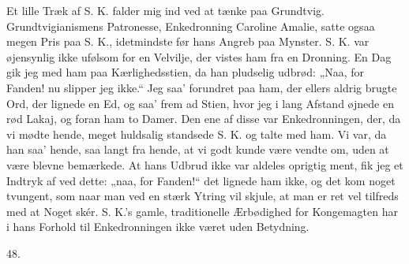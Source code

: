 \documentclass[12pt,a4paper,openany]{book}
\newcommand{\secnum}[1]{\par\begin{center}#1\end{center}\par\nobreak}
\newcommand{\opage}[1]{\marginnote{\footnotesize\textit{[#1]}}}
\begin{document}
Et lille Træk af S. K. falder mig ind ved at tænke paa Grundtvig.
Grundtvigianismens Patronesse, Enkedronning Caroline Amalie, satte ogsaa megen
Pris paa S. K., idetmindste før hans Angreb paa Mynster. S. K. var øjensynlig
ikke ufølsom for en Velvilje, der vistes
\opage{371}ham fra en Dronning. En Dag gik jeg med ham paa Kærlighedsstien, da
han pludselig udbrød: „Naa, for Fanden! nu slipper jeg ikke.“ Jeg saa’
forundret paa ham, der ellers aldrig brugte Ord, der lignede en Ed, og saa’
frem ad Stien, hvor jeg i lang Afstand øjnede en rød Lakaj, og foran ham to
Damer. Den ene af disse var Enkedronningen, der, da vi mødte hende, meget
huldsalig standsede S. K. og talte med ham. Vi var, da han saa’ hende, saa
langt fra hende, at vi godt kunde være vendte om, uden at være blevne
bemærkede. At hans Udbrud ikke var aldeles oprigtig ment, fik jeg et Indtryk
af ved dette: „naa, for Fanden!“ det lignede ham ikke, og det kom noget
tvungent, som naar man ved en stærk Ytring vil skjule, at man er ret vel
tilfreds med at Noget skér. S. K.’s gamle, traditionelle Ærbødighed for
Kongemagten har i hans Forhold til Enkedronningen ikke været uden Betydning.

\secnum{48.}
\end{document}
